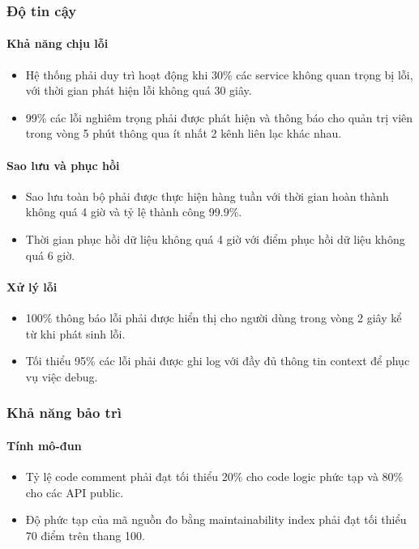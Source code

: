 \subsubsection{Độ tin cậy}

\paragraph{Khả năng chịu lỗi}
\begin{itemize}
    \item Hệ thống phải duy trì hoạt động khi 30\% các service không quan trọng bị lỗi, với thời gian phát hiện lỗi không quá 30 giây. 
    \item 99\% các lỗi nghiêm trọng phải được phát hiện và thông báo cho quản trị viên trong vòng 5 phút thông qua ít nhất 2 kênh liên lạc khác nhau. 
\end{itemize}

\paragraph{Sao lưu và phục hồi}
\begin{itemize}
    \item Sao lưu toàn bộ phải được thực hiện hàng tuần với thời gian hoàn thành không quá 4 giờ và tỷ lệ thành công 99.9\%. 
    \item Thời gian phục hồi dữ liệu không quá 4 giờ với điểm phục hồi dữ liệu không quá 6 giờ. 
\end{itemize}

\paragraph{Xử lý lỗi}
\begin{itemize}
    \item 100\% thông báo lỗi phải được hiển thị cho người dùng trong vòng 2 giây kể từ khi phát sinh lỗi. 
    \item Tối thiểu 95\% các lỗi phải được ghi log với đầy đủ thông tin context để phục vụ việc debug. 
\end{itemize}

\subsubsection{Khả năng bảo trì}

\paragraph{Tính mô-đun}
\begin{itemize}
    \item Tỷ lệ code comment phải đạt tối thiểu 20\% cho code logic phức tạp và 80\% cho các API public. 
    \item Độ phức tạp của mã nguồn đo bằng maintainability index phải đạt tối thiểu 70 điểm trên thang 100.
\end{itemize}

